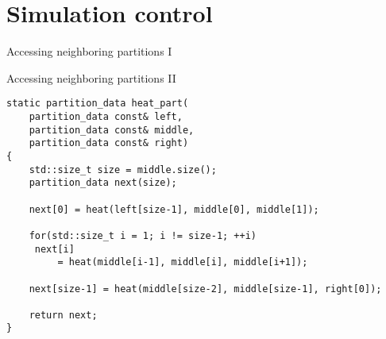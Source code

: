 \documentclass[12pt,t]{beamer}
\begin{document}
\section{Simulation control}


\begin{frame}{Accessing neighboring partitions I}

\begin{center}
\end{center}
\end{frame}


\begin{frame}[fragile]{Accessing neighboring partitions II}
\vspace{-0.5cm}
\begin{lstlisting}
static partition_data heat_part(
    partition_data const& left,
    partition_data const& middle, 
    partition_data const& right)
{
    std::size_t size = middle.size();
    partition_data next(size);

    next[0] = heat(left[size-1], middle[0], middle[1]);

    for(std::size_t i = 1; i != size-1; ++i)
     next[i] 
         = heat(middle[i-1], middle[i], middle[i+1]);

    next[size-1] = heat(middle[size-2], middle[size-1], right[0]);

    return next;
}
\end{lstlisting}
\end{frame}
\end{document}
